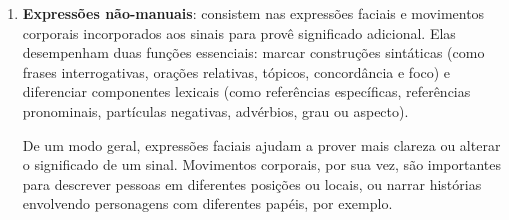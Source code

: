 \begin{enumerate}
        {capitulos/fundamentacao/imagens/espaco_enunciacao} %
        {height=6cm} %
        {Espaço de enunciação da língua de sinais} %
        {quadros-2004-estudos-linguisticos} %

        
    \item \textbf{Expressões não-manuais}: consistem nas expressões faciais e movimentos corporais incorporados aos sinais para provê significado adicional. Elas desempenham duas funções essenciais: marcar construções sintáticas (como frases interrogativas, orações relativas, tópicos, concordância e foco) e diferenciar componentes lexicais (como referências específicas, referências pronominais, partículas negativas, advérbios, grau ou aspecto).
    
    De um modo geral, expressões faciais ajudam a prover mais clareza ou alterar o significado de um sinal. 
    Movimentos corporais, por sua vez, são importantes para descrever pessoas em diferentes posições ou locais, ou narrar histórias envolvendo personagens com diferentes papéis, por exemplo.
 
\end{enumerate}
